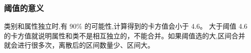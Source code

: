 \subsubsection*{阈值的意义}
类别和属性独立时,有 90\% 的可能性,计算得到的卡方值会小于 4.6。 大于阈值 4.6 的卡方值就说明属性和类不是相互独立的，不能合并。如果阈值选的大,区间合并就会进行很多次，离散后的区间数量少、区间大。